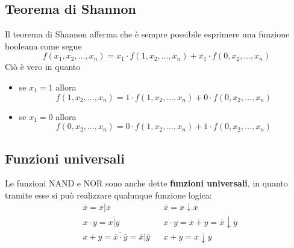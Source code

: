 \documentclass[a4paper]{extarticle}
\begin{document}
\subsection{Teorema di Shannon}
Il teorema di Shannon afferma che è sempre possibile esprimere una funzione booleana come segue
\[f(x_1,x_2,\dots,x_n)=x_1 \cdot f(1,x_2,\dots,x_n) + \overline{x_1} \cdot f(0,x_2,\dots,x_n)\]
Ciò è vero in quanto
\begin{itemize}
    \item se $x_1=1$ allora
    \[f(1,x_2,\dots,x_n)=1 \cdot f(1,x_2,\dots,x_n) + 0 \cdot f(0,x_2,\dots,x_n)\]
    \item se $x_1=0$ allora
    \[f(0,x_2,\dots,x_n)=0 \cdot f(1,x_2,\dots,x_n) + 1 \cdot f(0,x_2,\dots,x_n)\]
\end{itemize}

\vspace{1em}
\noindent
\subsection{Funzioni universali}
Le funzioni NAND e NOR sono anche dette \textbf{funzioni universali}, in quanto tramite esse si può realizzare qualunque funzione logica:
\begin{align*}
    &\overline{x}=x \vert x & & \overline{x} = x \downarrow x\\
    &x \cdot y = \overline{x \vert y} & & x \cdot y = \overline{\overline{x}+\overline{y}} = \overline{x} \downarrow \overline{y}\\
    &x+y=\overline{\overline{x} \cdot \overline{y}}=\overline{x} \vert \overline{y} & & x+y = \overline{x \downarrow y}
\end{align*}

\vspace{1em}
\noindent
\end{document}
